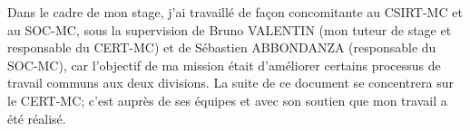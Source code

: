 Dans le cadre de mon stage, j'ai travaillé de façon concomitante au CSIRT-MC et au SOC-MC, sous la supervision de Bruno VALENTIN (mon tuteur de stage et responsable du CERT-MC) et de Sébastien ABBONDANZA (responsable du SOC-MC), car l'objectif de ma mission était d'améliorer certains processus de travail communs aux deux divisions. La suite de ce document se concentrera sur le CERT-MC; c'est auprès de ses équipes et avec son soutien que mon travail a été réalisé.